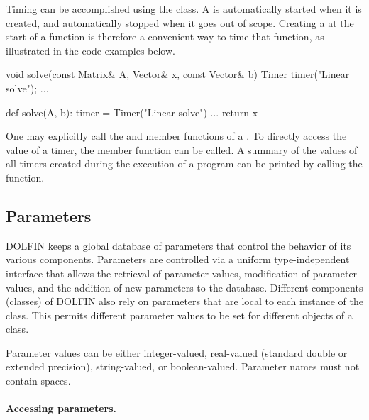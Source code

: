 Timing can be accomplished using the  class. A  is
automatically started when it is created, and automatically stopped when
it goes out of scope. Creating a  at the start of a function
is therefore a convenient way to time that function, as illustrated in
the code examples below.
\begin{c++}
void solve(const Matrix& A, Vector& x, const Vector& b)
{
  Timer timer("Linear solve");
  ...
}
\end{c++}
\begin{python}
def solve(A, b):
  timer = Timer("Linear solve")
  ...
  return x
\end{python}
One may explicitly call the  and  member
functions of a . To directly access the value of a timer,
the  member function can be called. A summary of the
values of all timers created during the execution of a program can be
printed by calling the  function.

\subsection{Parameters}

DOLFIN keeps a global database of parameters that control the behavior
of its various components. Parameters are controlled via a uniform
type-independent interface that allows the retrieval of parameter
values, modification of parameter values, and the addition of new
parameters to the database. Different components (classes) of DOLFIN
also rely on parameters that are local to each instance of the class.
This permits different parameter values to be set for different
objects of a class.

Parameter values can be either integer-valued, real-valued (standard
double or extended precision), string-valued, or boolean-valued. Parameter
names must not contain spaces.

\paragraph{Accessing parameters.}

